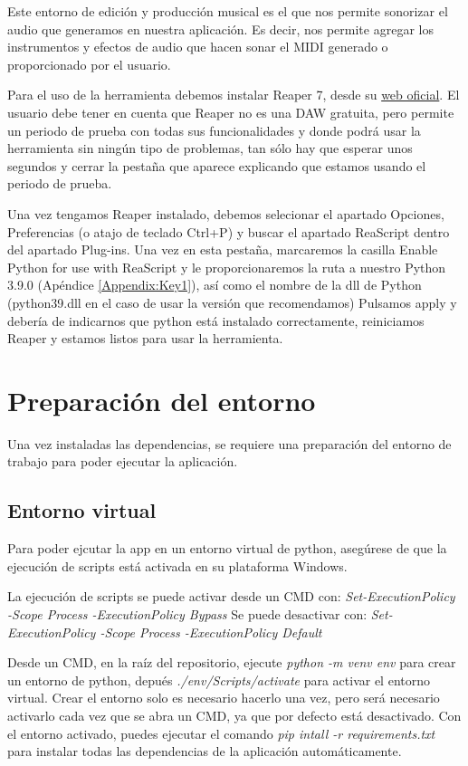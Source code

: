	Este entorno de edición y producción musical es el que nos permite sonorizar el audio que generamos en nuestra aplicación. Es decir, nos permite agregar los instrumentos y efectos de audio que hacen sonar el MIDI generado o proporcionado por el usuario.
    
    Para el uso de la herramienta debemos instalar Reaper 7, desde su \href{https://www.reaper.fm/download.php}{web oficial}. El usuario debe tener en cuenta que Reaper no es una DAW gratuita, pero permite un periodo de prueba con todas sus funcionalidades y donde podrá usar la herramienta sin ningún tipo de problemas, tan sólo hay que esperar unos segundos y cerrar la pestaña que aparece explicando que estamos usando el periodo de prueba.

    Una vez tengamos Reaper instalado, debemos selecionar el apartado Opciones, Preferencias (o atajo de teclado Ctrl+P) y buscar el apartado ReaScript dentro del apartado Plug-ins. Una vez en esta pestaña, marcaremos la casilla Enable Python for use with ReaScript y le proporcionaremos la ruta a nuestro Python 3.9.0 (Apéndice \ref{Appendix:Key1}), así como el nombre de la dll de Python (python39.dll en el caso de usar la versión que recomendamos) Pulsamos apply y debería de indicarnos que python está instalado correctamente, reiniciamos Reaper y estamos listos para usar la herramienta.


\section{Preparación del entorno}
\label{sec:app:preparacionEntorno}
Una vez instaladas las dependencias, se requiere una preparación del entorno de trabajo para poder ejecutar la aplicación.

\subsection{Entorno virtual}
Para poder ejcutar la app en un entorno virtual de python, asegúrese de que la ejecución de scripts está activada en su plataforma Windows. 

La ejecución de scripts se puede activar desde un CMD con:
\textit{Set-ExecutionPolicy -Scope Process -ExecutionPolicy Bypass}
Se puede desactivar con:
\textit{Set-ExecutionPolicy -Scope Process -ExecutionPolicy Default}

Desde un CMD, en la raíz del repositorio, ejecute \textit{python -m venv env} para crear un entorno de python, depués \textit{./env/Scripts/activate} para activar el entorno virtual. Crear el entorno solo es necesario hacerlo una vez, pero será necesario activarlo cada vez que se abra un CMD, ya que por defecto está desactivado. Con el entorno activado, puedes ejecutar el comando \textit{pip intall -r requirements.txt} para instalar todas las dependencias de la aplicación automáticamente.

